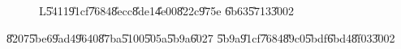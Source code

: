\begin{figure}[th]
\caption{L\U{5411}\U{91cf}\U{7684}\U{8ecc}\U{8de1}\U{4e00}\U{822c}\U{975e}%
\U{6b63}\U{5713}\U{3002}}
\begin{center}
\end{center}
\end{figure}

\clearpage%

\begin{case}
\U{8207}\U{5be6}\U{9ad4}\U{9640}\U{87ba}\U{5100}\U{505a}\U{5b9a}\U{6027}%
\U{5b9a}\U{91cf}\U{7684}\U{89c0}\U{5bdf}\U{6bd4}\U{8f03}\U{3002}
\end{case}

